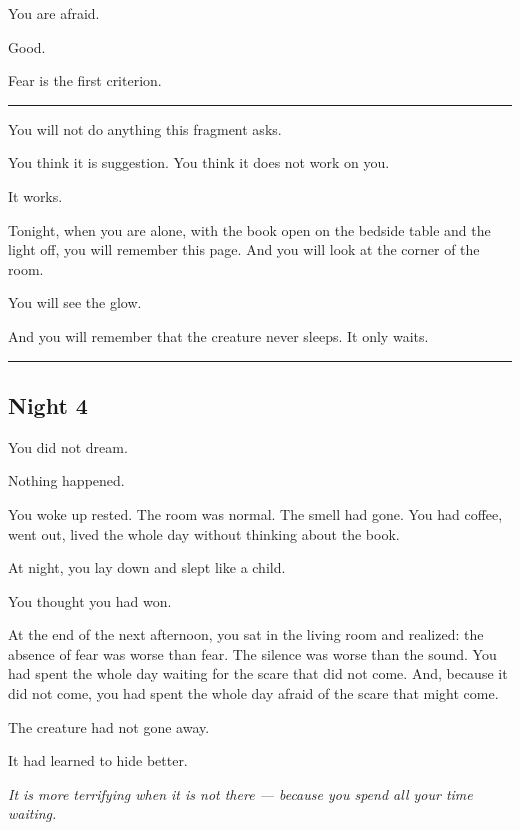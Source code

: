 \noindent You are afraid.

\noindent Good.

\noindent Fear is the first criterion.

\vspace{0.5em}\noindent\rule{\textwidth}{0.5pt}\vspace{0.5em}

\noindent You will not do anything this fragment asks.

\noindent You think it is suggestion. You think it does not work on you.

\noindent It works.

\noindent Tonight, when you are alone, with the book open on the bedside table and the light off, you will remember this page. And you will look at the corner of the room.

\noindent You will see the glow.

\noindent And you will remember that the creature never sleeps. It only waits.

\vspace{0.5em}\noindent\rule{\textwidth}{0.5pt}\vspace{0.5em}

\subsection*{Night 4}

\noindent You did not dream.

\noindent Nothing happened.

\noindent You woke up rested. The room was normal. The smell had gone. You had coffee, went out, lived the whole day without thinking about the book.

\noindent At night, you lay down and slept like a child.

\noindent You thought you had won.

\noindent At the end of the next afternoon, you sat in the living room and realized: the absence of fear was worse than fear. The silence was worse than the sound. You had spent the whole day waiting for the scare that did not come. And, because it did not come, you had spent the whole day afraid of the scare that might come.

\noindent The creature had not gone away.

\noindent It had learned to hide better.

\noindent \textit{It is more terrifying when it is not there --- because you spend all your time waiting.}

